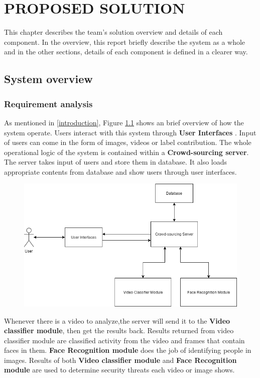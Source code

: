 \chapter{PROPOSED SOLUTION}
\label{chap:solution}

This chapter describes the team's solution overview and details of each component. In the overview, this report briefly describe the system as a whole and in the other sections, details of each component is defined in a clearer way.
\section{System overview}
\subsection{Requirement analysis}
As mentioned in \ref{introduction},
Figure \ref{chap3:system_overview_basic} shows an brief overview of how the system operate. Users interact with this system through \textbf{User Interfaces}
. Input of users can come in the form of images, videos or label contribution. The whole operational logic of the  system is contained within a \textbf{Crowd-sourcing server}. The server takes input of users and store them in database. It also loads appropriate contents from database and show users through user interfaces. 
\begin{center}
    \begin{figure}[H]
    \centering
    \includegraphics[width=1\columnwidth]{images/chap3/system_overview_basic.png}
    \label{chap3:system_overview_basic}
    \end{figure}
\end{center}
Whenever there is a video to analyze,the server will send it to the \textbf{Video classifier module}, then get the results back. Results returned from video classifier module are classified activity from the video and frames that contain faces in them. \textbf{Face Recognition module} does the job of identifying people in images. Results of both \textbf{Video classifier module} and \textbf{Face Recognition module} are used to determine security threats each video or image shows.

